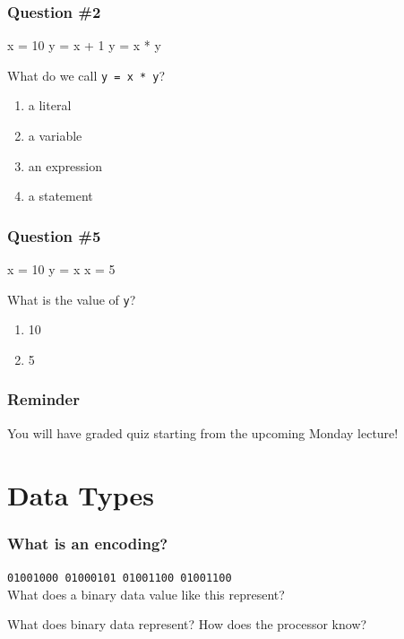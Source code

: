 \documentclass[11pt]{beamer}
\begin{document}
\begin{frame}[fragile]
  \frametitle{Question \#2}
  \Enlarge

  \begin{semiverbatim}
x = 10
y = x + 1
y = x * y
  \end{semiverbatim}
  What do we call \texttt{y = x * y}?
  \begin{enumerate}[label=\Alph*]
  \item  a literal
  \item  a variable
  \item  an expression
  \item  a statement
  \end{enumerate}
\end{frame}

\begin{frame}[fragile]
  \frametitle{Question \#5}
  \Enlarge

  \begin{semiverbatim}
x = 10
y = x
x = 5
  \end{semiverbatim}
  What is the value of \texttt{y}?
  \begin{enumerate}[label=\Alph*]
  \item  10
  \item  5
  \end{enumerate}
\end{frame}


\begin{frame}
	\frametitle{Reminder}
	\Enlarge
	\begin{itemize}
		\myitem  You will have graded quiz starting from the upcoming Monday lecture!
	\end{itemize}
\end{frame}


\section{Data Types}

\begin{frame}
  \frametitle{What is an \textbf{encoding}?}
  \Enlarge

  \texttt{01001000 01000101 01001100 01001100} \\
  What does a binary data value like this represent?
  \begin{itemize}
  \myitem  What does binary data represent? \pause
  \myitem  How does the processor know?
  \end{itemize}
\end{frame}
\end{document}
